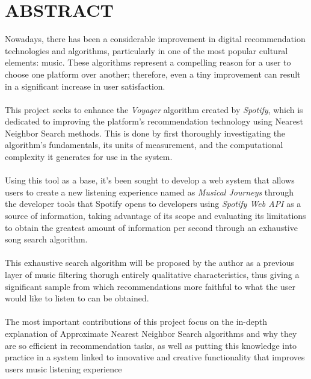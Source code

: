 \documentclass[12pt]{report}
\theoremstyle{definition}
\begin{document}
\newpage

\chapter*{ABSTRACT}

Nowadays, there has been a considerable improvement in digital recommendation technologies and algorithms, particularly in one of the most popular cultural elements: music. These algorithms represent a compelling reason for a user to choose one platform over another; therefore, even a tiny improvement can result in a significant increase in user satisfaction.
\\\\
This project seeks to enhance the \textit{Voyager} algorithm created by \textit{Spotify}, which is dedicated to improving the platform's recommendation technology using Nearest Neighbor Search methods.
This is done by first thoroughly investigating the algorithm's fundamentals, its units of measurement, and the computational complexity it generates for use in the system.
\\\\
Using this tool as a base, it's been sought to develop a web system that allows users to create a new listening experience named as \textit{Musical Journeys} through the developer tools that Spotify opens to developers using \textit{Spotify Web API} as a source of information, taking advantage of its scope and evaluating its limitations to obtain the greatest amount of information per second through an exhaustive song search algorithm.
\\\\
This exhaustive search algorithm will be proposed by the author as a previous layer of music filtering thorugh entirely qualitative characteristics, thus giving a significant sample from which recommendations more faithful to what the user would like to listen to can be obtained.
\\\\
The most important contributions of this project focus on the in-depth explanation of Approximate Nearest Neighbor Search algorithms and why they are so efficient in recommendation tasks, as well as putting this knowledge into practice in a system linked to innovative and creative functionality that improves users music listening experience

\newpage



\newpage




\cleardoublepage
{}
{}
\printbibliography 
\end{document}
